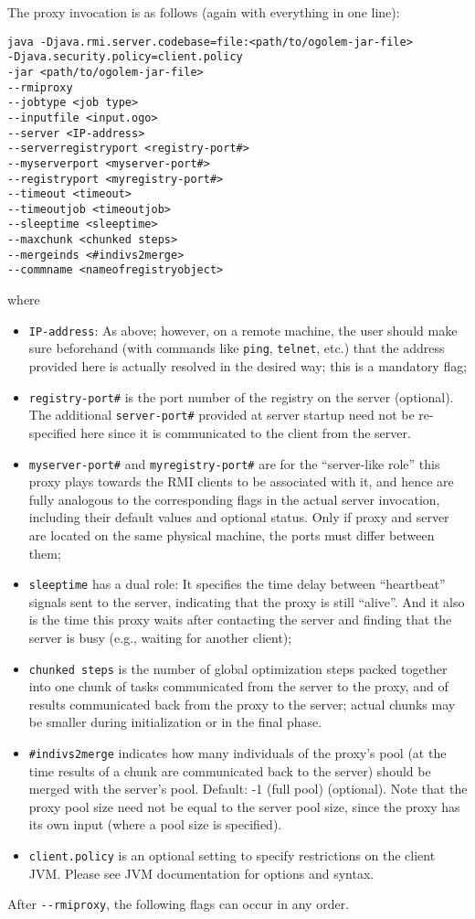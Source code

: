 \documentclass[a4paper,10pt]{scrbook}
\begin{document}
The proxy invocation is as follows (again with everything in one line):
\begin{verbatim}
java -Djava.rmi.server.codebase=file:<path/to/ogolem-jar-file> 
-Djava.security.policy=client.policy 
-jar <path/to/ogolem-jar-file> 
--rmiproxy
--jobtype <job type>
--inputfile <input.ogo>
--server <IP-address>
--serverregistryport <registry-port#>
--myserverport <myserver-port#>
--registryport <myregistry-port#>
--timeout <timeout> 
--timeoutjob <timeoutjob> 
--sleeptime <sleeptime>
--maxchunk <chunked steps>
--mergeinds <#indivs2merge>
--commname <nameofregistryobject>
\end{verbatim}
where
\begin{itemize}
\item \texttt{IP-address}: As above; however, on a remote machine, the user
  should make sure beforehand (with commands like \texttt{ping},
  \texttt{telnet}, etc.) that the address provided here is actually resolved
  in the desired way; this is a mandatory flag;
\item \texttt{registry-port\#} is the port number of the registry on the
  server (optional). The additional \texttt{server-port\#} provided at server
  startup need not be re-specified here since it is communicated to the client
  from the server.
\item \verb|myserver-port#| and \verb|myregistry-port#| are for the
  ``server-like role'' this proxy plays towards the RMI clients to be
  associated with it, and hence are fully analogous to the corresponding flags
  in the actual server invocation, including their default values and optional
  status. Only if proxy and server are located on the same physical machine,
  the ports must differ between them;
\item \texttt{sleeptime} has a dual role:
  It specifies the time delay between ``heartbeat'' signals sent to the
  server, indicating that the proxy is still ``alive''. And it also
  is the time this proxy waits after contacting the
  server and finding that the server is busy (e.g., waiting for another
  client);
\item \texttt{chunked steps} is the number of global optimization steps packed
  together into one chunk of tasks communicated from the server to the proxy,
  and of results communicated back from the proxy to the server; actual
  chunks may be smaller during initialization or in the final phase.
\item \verb|#indivs2merge| indicates how many individuals of the proxy's pool
  (at the time results of a chunk are communicated back to the server) should
  be merged with the server's pool. Default: -1 (full pool) (optional).
  Note that the proxy pool size need not be equal to the server pool size,
  since the proxy has its own input (where a pool size is specified).
\item \texttt{client.policy} is an optional setting to specify restrictions on
  the client JVM. Please see JVM documentation for options and syntax.
\end{itemize}
After \verb|--rmiproxy|, the following flags can occur in any order.
\end{document}
